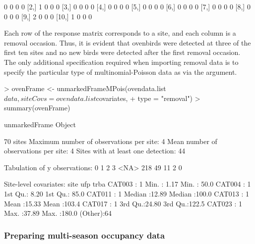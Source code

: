 \documentclass[article,shortnames]{jss}
\begin{document}
\begin{Schunk}
\begin{Soutput}
      [,1] [,2] [,3] [,4]
 [1,]    0    0    0    0
 [2,]    1    0    0    0
 [3,]    0    0    0    0
 [4,]    0    0    0    0
 [5,]    0    0    0    0
 [6,]    0    0    0    0
 [7,]    0    0    0    0
 [8,]    0    0    0    0
 [9,]    2    0    0    0
[10,]    1    0    0    0
\end{Soutput}
\end{Schunk}

Each row of the response matrix corresponds to a site, and each column is a 
removal occasion. Thus, it is evident that ovenbirds were detected at three of 
the first ten sites and no new birds were detected after the first removal 
occasion.  The only additional specification required when importing removal 
data is to specify the particular type of multinomial-Poisson data as
 via the  argument.

\begin{Schunk}
\begin{Sinput}
> ovenFrame <- unmarkedFrameMPois(ovendata.list$data, siteCovs = ovendata.list$covariates, 
+     type = "removal")
> summary(ovenFrame)
\end{Sinput}
\begin{Soutput}
unmarkedFrame Object

70 sites
Maximum number of observations per site: 4 
Mean number of observations per site: 4 
Sites with at least one detection: 44 

Tabulation of y observations:
   0    1    2    3 <NA> 
 218   49   11    2    0 

Site-level covariates:
      site         ufp             trba      
 CAT003 : 1   Min.   : 1.17   Min.   : 50.0  
 CAT004 : 1   1st Qu.: 8.20   1st Qu.: 85.0  
 CAT011 : 1   Median :12.89   Median :100.0  
 CAT013 : 1   Mean   :15.33   Mean   :103.4  
 CAT017 : 1   3rd Qu.:24.80   3rd Qu.:122.5  
 CAT023 : 1   Max.   :37.89   Max.   :180.0  
 (Other):64                                  
\end{Soutput}
\end{Schunk}

\subsubsection{Preparing multi-season occupancy data}
\end{document}
